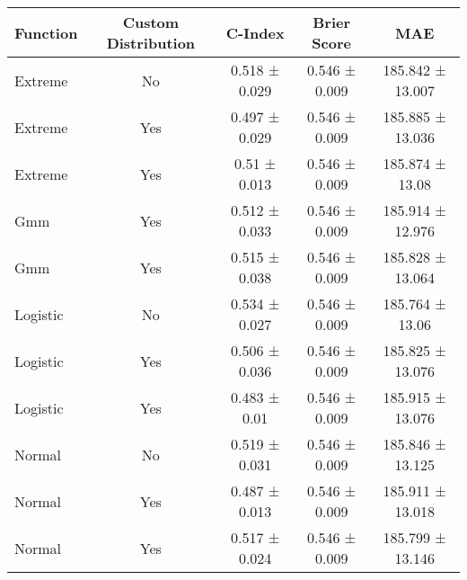 \begin{tabular}{lcccc}
\toprule
Function & Custom Distribution & C-Index & Brier Score & MAE \\
\midrule
Extreme & No & 0.518 ± 0.029 & 0.546 ± 0.009 & 185.842 ± 13.007 \\
Extreme & Yes & 0.497 ± 0.029 & 0.546 ± 0.009 & 185.885 ± 13.036 \\
Extreme & Yes & 0.51 ± 0.013 & 0.546 ± 0.009 & 185.874 ± 13.08 \\
Gmm & Yes & 0.512 ± 0.033 & 0.546 ± 0.009 & 185.914 ± 12.976 \\
Gmm & Yes & 0.515 ± 0.038 & 0.546 ± 0.009 & 185.828 ± 13.064 \\
Logistic & No & 0.534 ± 0.027 & 0.546 ± 0.009 & 185.764 ± 13.06 \\
Logistic & Yes & 0.506 ± 0.036 & 0.546 ± 0.009 & 185.825 ± 13.076 \\
Logistic & Yes & 0.483 ± 0.01 & 0.546 ± 0.009 & 185.915 ± 13.076 \\
Normal & No & 0.519 ± 0.031 & 0.546 ± 0.009 & 185.846 ± 13.125 \\
Normal & Yes & 0.487 ± 0.013 & 0.546 ± 0.009 & 185.911 ± 13.018 \\
Normal & Yes & 0.517 ± 0.024 & 0.546 ± 0.009 & 185.799 ± 13.146 \\
\bottomrule
\end{tabular}
